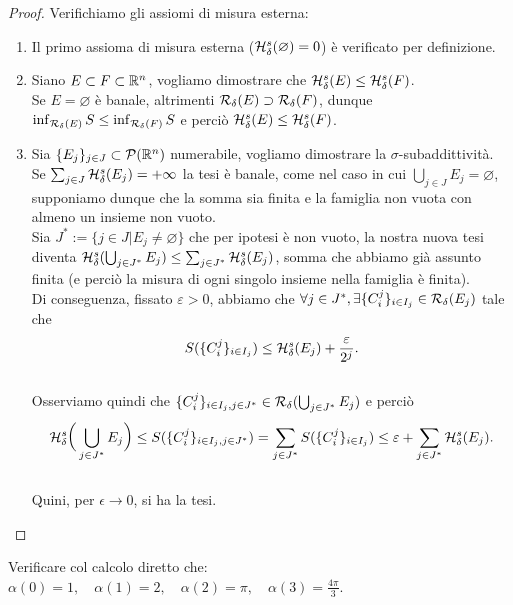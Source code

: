 \begin{proof}Verifichiamo gli assiomi di misura esterna:
  \begin{enumerate}[label=$\roman*)$]
      \item Il primo assioma di misura esterna ($\mathcal{H}_\delta^s(\varnothing) = 0$) è verificato per definizione.
      \item Siano $E \subset F \subset \mathbb{R}^n$, vogliamo dimostrare che $\mathcal{H}_\delta^s(E) \le \mathcal{H}_\delta^s(F)$.\\
          Se $E = \varnothing$ è banale, altrimenti $\mathcal{R}_\delta(E) \supset \mathcal{R}_\delta(F)$, dunque $\inf_{\mathcal{R}_\delta(E)} S \le \inf_{\mathcal{R}_\delta(F)} S$ e perciò $\mathcal{H}_\delta^s(E) \le \mathcal{H}_\delta^s(F)$.
      \item Sia $\{E_j\}_{j \in J} \subset \mathcal{P}(\mathbb{R}^n)$ numerabile, vogliamo dimostrare la $\sigma$-subaddittività.\\
          Se $\sum_{j \in J} \mathcal{H}_\delta^s(E_j) = + \infty$ la tesi è banale, come nel caso in cui $\bigcup_{j \in J} E_j = \varnothing$, supponiamo dunque che la somma sia finita e la famiglia non vuota con almeno un insieme non vuoto.\\
          Sia $J^* := \{ j \in J | E_j \neq \varnothing\}$ che per ipotesi è non vuoto, la nostra nuova tesi diventa $\mathcal{H}_\delta^s(\bigcup_{j \in J^*} E_j) \le \sum_{j \in J^*} \mathcal{H}_\delta^s(E_j)$, somma che abbiamo già assunto finita (e perciò la misura di ogni singolo insieme nella famiglia è finita).\\
          Di conseguenza, fissato $\varepsilon > 0$, abbiamo che $\forall j \in J^*, \exists \{C_i^j\}_{i \in I_j} \in \mathcal{R}_\delta(E_j)$ tale che \[S(\{C_i^j\}_{i \in I_j}) \le \mathcal{H}_\delta^s(E_j) + \frac{\varepsilon}{2^j}.\]\\
          Osserviamo quindi che $\{C_i^j\}_{i \in I_j,j \in J^*} \in \mathcal{R}_\delta(\bigcup_{j \in J^*} E_j)$ e perciò \[\mathcal{H}_\delta^s\bigg(\bigcup_{j \in J^*} E_j\bigg) \le S(\{C_i^j\}_{i \in I_j, j \in J^*}) = \sum_{j \in J^*} S(\{C_i^j\}_{i \in I_j}) \le \varepsilon + \sum_{j \in J^*} \mathcal{H}_\delta^s(E_j).\]\\
          Quini, per $\epsilon \to 0$, si ha la tesi.
  \end{enumerate}        
\end{proof}

\begin{exc}Verificare col calcolo diretto che: $\alpha(0)=1, \quad \alpha(1)=2, \quad \alpha(2)=\pi, \quad \alpha(3)=\frac{4 \pi}{3}$.\end{exc}

